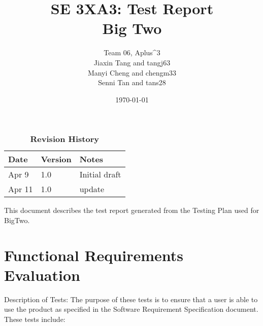 \documentclass[12pt, titlepage]{article}
\title{SE 3XA3: Test Report\\Big Two}
\author{Team 06, Aplus^3
		\\ Jiaxin Tang and tangj63
		\\ Manyi Cheng and chengm33
		\\ Senni Tan and tans28
}
\date{\today}
\begin{document}
\maketitle

\tableofcontents
\listoftables
\listoffigures

\begin{table}[bp]
\caption{\bf Revision History}
\begin{tabularx}{\textwidth}{p{3cm}p{2cm}X}
\toprule {\bf Date} & {\bf Version} & {\bf Notes}\\
\midrule
Apr 9 & 1.0 & Initial draft\\
Apr 11 & 1.0 & update\\
\bottomrule
\end{tabularx}
\end{table}

\newpage


This document describes the test report generated from the Testing Plan used for BigTwo.

\section{Functional Requirements Evaluation}
Description of Tests: The purpose of these tests is to ensure that a user is able to use the
product as specified in the Software Requirement Specification document. These tests include:
\end{document}
